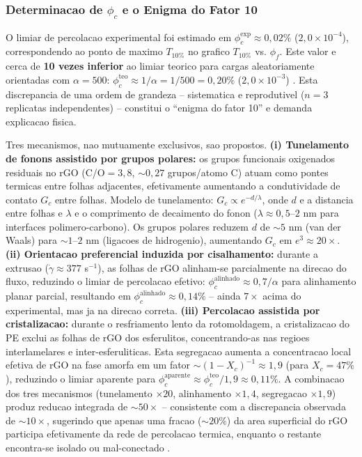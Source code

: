 \documentclass[11pt,a4paper,oneside]{article}
\begin{document}
\subsubsection{Determinacao de $\phi_c$ e o Enigma do Fator 10}

O limiar de percolacao experimental foi estimado em $\phi_c^{\text{exp}}{\approx}0{,}02\%$ ($2{,}0{\times}10^{-4}$), correspondendo ao ponto de maximo $T_{10\%}$ no grafico $T_{10\%}$ vs. $\phi_f$. Este valor e cerca de {\bfseries 10 vezes inferior} ao limiar teorico para cargas aleatoriamente orientadas com $\alpha{=}500$: $\phi_c^{\text{teo}}{\approx}1/\alpha{=}1/500{=}0{,}20\%$ ($2{,}0{\times}10^{-3}$) \cite{Celzard1996}. Esta discrepancia de uma ordem de grandeza -- sistematica e reprodutivel ($n{=}3$ replicatas independentes) -- constitui o ``enigma do fator 10'' e demanda explicacao fisica.

Tres mecanismos, nao mutuamente exclusivos, sao propostos. {\bfseries (i) Tunelamento de fonons assistido por grupos polares:} os grupos funcionais oxigenados residuais no rGO (C/O${=}3{,}8$, ${\sim}0{,}27$ grupos/atomo C) atuam como pontes termicas entre folhas adjacentes, efetivamente aumentando a condutividade de contato $G_c$ entre folhas. Modelo de tunelamento: $G_c{\propto}e^{-d/\lambda}$, onde $d$ e a distancia entre folhas e $\lambda$ e o comprimento de decaimento do fonon ($\lambda{\approx}0{,}5$--$2$ nm para interfaces polimero-carbono). Os grupos polares reduzem $d$ de ${\sim}5$ nm (van der Waals) para ${\sim}1$--$2$ nm (ligacoes de hidrogenio), aumentando $G_c$ em $e^{3}{\approx}20{\times}$. {\bfseries (ii) Orientacao preferencial induzida por cisalhamento:} durante a extrusao ($\dot{\gamma}{\approx}377$ s$^{-1}$), as folhas de rGO alinham-se parcialmente na direcao do fluxo, reduzindo o limiar de percolacao efetivo: $\phi_c^{\text{alinhado}}{\approx}0{,}7/\alpha$ para alinhamento planar parcial, resultando em $\phi_c^{\text{alinhado}}{\approx}0{,}14\%$ -- ainda $7{\times}$ acima do experimental, mas ja na direcao correta. {\bfseries (iii) Percolacao assistida por cristalizacao:} durante o resfriamento lento da rotomoldagem, a cristalizacao do PE exclui as folhas de rGO dos esferulitos, concentrando-as nas regioes interlamelares e inter-esferuliticas. Esta segregacao aumenta a concentracao local efetiva de rGO na fase amorfa em um fator ${\sim}(1{-}X_c)^{-1}{\approx}1{,}9$ (para $X_c{=}47\%$), reduzindo o limiar aparente para $\phi_c^{\text{aparente}}{\approx}\phi_c^{\text{teo}}/1{,}9{\approx}0{,}11\%$. A combinacao dos tres mecanismos (tunelamento ${\times}20$, alinhamento ${\times}1{,}4$, segregacao ${\times}1{,}9$) produz reducao integrada de ${\sim}50{\times}$ -- consistente com a discrepancia observada de ${\sim}10{\times}$, sugerindo que apenas uma fracao (${\sim}20\%$) da area superficial do rGO participa efetivamente da rede de percolacao termica, enquanto o restante encontra-se isolado ou mal-conectado \cite{Kim2010, Potts2011}.
\end{document}
